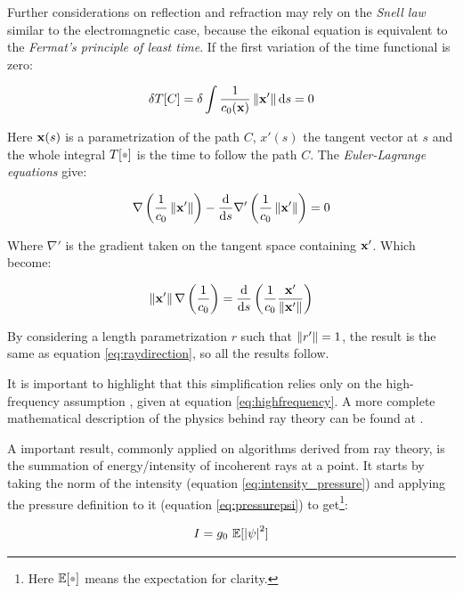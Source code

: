 Further considerations on reflection and refraction may rely on the
\textit{Snell law} similar to the electromagnetic case, because the eikonal
equation is equivalent to the \textit{Fermat's principle of least time}. If
the first variation of the time functional is zero:

\begin{equation*}
\delta T[C] = \delta \int \frac{1}{c_0(\mathrm{\mathbf{x}})}
\left\lVert\mathrm{\mathbf{x}}'\right\rVert \mathrm{d} s = 0
\end{equation*}

Here $\mathrm{\mathbf{x}}(s)$ is a parametrization of the path $C$, $x'(s)$ the tangent
vector at $s$ and the whole integral $T[\parm]$ is the time to follow the path
$C$. The \textit{Euler-Lagrange equations} give:


\begin{equation*}
\nabla\left(\frac{1}{c_0}\left\lVert\mathrm{\mathbf{x}}'\right\rVert\right) - \frac{\mathrm{d}}{\mathrm{d} s}
\nabla'\left(\frac{1}{c_0} \left\lVert\mathrm{\mathbf{x}}'\right\rVert\right) = 0
\end{equation*}

Where $\nabla'$ is the gradient taken on the tangent space containing
$\mathrm{\mathbf{x}}'$.
Which become:

\begin{equation*}
\left\lVert\mathrm{\mathbf{x}}'\right\rVert\nabla\left(\frac{1}{c_0}\right) =
\frac{\mathrm{d}}{\mathrm{d} s}\left( \frac{1}{c_0}
\frac{\mathrm{\mathbf{x}}'}{\left\lVert\mathrm{\mathbf{x}}'\right\rVert}\right)
\end{equation*}

By considering a length parametrization $r$ such that $\left\lVert r'\right\rVert=1$, the
result is the same as equation \ref{eq:raydirection}, so all the results follow.

It is important to highlight that this simplification relies only on the
high-frequency assumption \cite{national1969physics}, given at equation
\ref{eq:highfrequency}. A more complete mathematical description of the physics
behind ray theory can be found at \citet{Lefebvre}.

A important result, commonly applied on algorithms derived from ray theory, is
the summation of energy/intensity of incoherent rays at a point. It starts by
taking the norm of the intensity (equation \ref{eq:intensity_pressure}) and applying the
pressure definition to it (equation \ref{eq:pressurepsi}) to get\footnote{Here
$\mathbb{E}[\parm]$ means the expectation for clarity.}:


\begin{equation}\label{eq:intensity_psi}
I = g_0~\mathbb{E}[\left|\psi\right|^2]
\end{equation}

